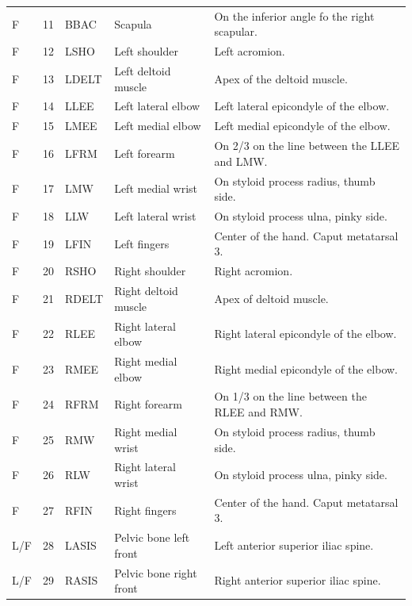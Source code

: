 \documentclass[fleqn,12pt]{wlpeerj}
\begin{document}
\begin{table}
\begin{tabular}{lrlll}
    F   & 11 & BBAC  & Scapula                               & On the inferior angle fo the right scapular. \\
    F   & 12 & LSHO  & Left shoulder                         & Left acromion. \\
    F   & 13 & LDELT & Left deltoid muscle                   & Apex of the deltoid muscle. \\
    F   & 14 & LLEE  & Left lateral elbow                    & Left lateral epicondyle of the elbow. \\
    F   & 15 & LMEE  & Left medial elbow                     & Left medial epicondyle of the elbow. \\
    F   & 16 & LFRM  & Left forearm                          & On 2/3 on the line between the LLEE and LMW. \\
    F   & 17 & LMW   & Left medial wrist                     & On styloid process radius, thumb side. \\
    F   & 18 & LLW   & Left lateral wrist                    & On styloid process ulna, pinky side. \\
    F   & 19 & LFIN  & Left fingers                          & Center of the hand. Caput metatarsal 3. \\
    F   & 20 & RSHO  & Right shoulder                        & Right acromion. \\
    F   & 21 & RDELT & Right deltoid muscle                  & Apex of deltoid muscle. \\
    F   & 22 & RLEE  & Right lateral elbow                   & Right lateral epicondyle of the elbow. \\
    F   & 23 & RMEE  & Right medial elbow                    & Right medial epicondyle of the elbow. \\
    F   & 24 & RFRM  & Right forearm                         & On 1/3 on the line between the RLEE and RMW. \\
    F   & 25 & RMW   & Right medial wrist                    & On styloid process radius, thumb side. \\
    F   & 26 & RLW   & Right lateral wrist                   & On styloid process ulna, pinky side. \\
    F   & 27 & RFIN  & Right fingers                         & Center of the hand. Caput metatarsal 3. \\
    L/F & 28 & LASIS & Pelvic bone left front                & Left anterior superior iliac spine. \\
    L/F & 29 & RASIS & Pelvic bone right front               & Right anterior superior iliac spine. \\

\end{tabular}
\end{table}
\end{document}
